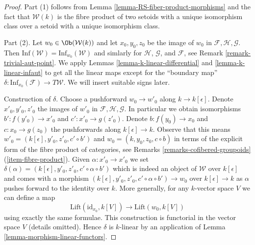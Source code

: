 \begin{proof}
Part (1) follows from Lemma \ref{lemma-RS-fiber-product-morphisms}
and the fact that $\mathcal{W}(k)$ is the fibre product of
two setoids with a unique isomorphism class over a setoid with
a unique isomorphism class.

\medskip\noindent
Part (2). Let $w_0 \in \Ob(\mathcal{W}(k))$ and let $x_0, y_0, z_0$ be
the image of $w_0$ in $\mathcal{F}, \mathcal{H}, \mathcal{G}$.
Then $\text{Inf}(\mathcal{W}) = \text{Inf}_{w_0}(\mathcal{W})$
and simlarly for $\mathcal{H}$, $\mathcal{G}$, and $\mathcal{F}$, see
Remark \ref{remark-trivial-aut-point}.
We apply Lemmas \ref{lemma-k-linear-differential} and
\ref{lemma-k-linear-infaut} to get all the linear maps
except for the ``boundary map''
$\delta : \text{Inf}_{x_0}(\mathcal{F}) \to T\mathcal{W}$.
We will insert suitable signs later.

\medskip\noindent
Construction of $\delta$. Choose a pushforward $w_0 \to w'_0$ along
$k \to k[\epsilon]$. Denote $x'_0, y'_0, z'_0$ the images of $w'_0$ in
$\mathcal{F}, \mathcal{H}, \mathcal{G}$. In particular
we obtain isomorphisms $b' : f(y'_0) \to x'_0$ and $c' : x'_0 \to g(z'_0)$.
Denote $b : f(y_0) \to x_0$ and $c : x_0 \to g(z_0)$ the pushforwards
along $k[\epsilon] \to k$. Observe that this means
$w'_0 = (k[\epsilon], y'_0, z'_0, c' \circ b')$ and
$w_0 = (k, y_0, z_0, c \circ b)$ in terms of the explicit form
of the fibre product of categories,
see Remarks \ref{remarks-cofibered-groupoids} (\ref{item-fibre-product}).
Given $\alpha : x'_0 \to x'_0$ we set
$\delta(\alpha) = (k[\epsilon], y'_0, z'_0, c' \circ \alpha \circ b')$
which is indeed an object of $\mathcal{W}$ over $k[\epsilon]$ and comes
with a morphism $(k[\epsilon], y'_0, z'_0, c' \circ \alpha \circ b') \to w_0$
over $k[\epsilon] \to k$ as $\alpha$ pushes forward to the identity over $k$.
More generally, for any $k$-vector space $V$ we can define a map
$$
\text{Lift}(\text{id}_{x_0}, k[V])
\longrightarrow
\text{Lift}(w_0, k[V])
$$
using exactly the same formulae. This construction is functorial
in the vector space $V$ (details omitted). Hence $\delta$ is $k$-linear
by an application of
Lemma \ref{lemma-morphism-linear-functors}.


\end{proof}
